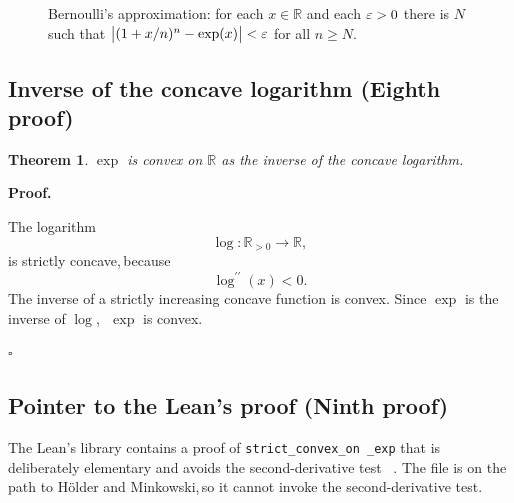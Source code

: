 \documentclass[11pt,reqno]{amsart}
\providecommand{\R}{\mathbb{R}}
\theoremstyle{redplain}
\newtheorem{theorem}{Theorem}[section]
\renewcommand{\qedsymbol}{\textcolor{proofqed}{\ensuremath{\square}}}
\renewenvironment{proof}[1][Proof]{\par\noindent\textbf{\textcolor{proofhead}{#1.}}\par\nobreak}{\par\nobreak\hfill\qedsymbol}
\providecommand{\comma}{,\,}
\numberwithin{equation}{section}
\begin{document}
\begin{figure}[tbph]
\centering
{}
\caption{Bernoulli's approximation: for each $x\in \R$ and each $\protect%
\varepsilon >0$ there is $N$ such that $\bigl|(1+x/n)^{n}-\exp (x)\bigr|<%
\protect\varepsilon $ for all $n\geq N$.}
\label{fig:bernoulli}
\end{figure}

\subsection{Inverse of the concave logarithm (Eighth proof)}

\begin{theorem}
\label{thm:log-inverse} $\exp $ is convex on $\R$ as the inverse of the
concave logarithm.
\end{theorem}

\begin{proof}
\noindent The logarithm 
\begin{equation*}
\log :\R_{>0}\rightarrow \R,
\end{equation*}
\noindent is strictly concave\comma because 
\begin{equation*}
\log ^{\prime \prime }(x)<0.
\end{equation*}
\noindent The inverse of a strictly increasing concave function is convex.
\noindent Since $\exp $ is the inverse of $\log $\comma\ $\exp $ is convex.
\end{proof}

\subsection{Pointer to the Lean's proof (Ninth proof)}

\noindent The Lean's library contains a proof of \texttt{strict\_convex\_on%
\_exp} that is deliberately elementary and avoids the second-derivative test~%
\cite{LeanMathlib}.\newline
The file is on the path to H\"{o}lder and Minkowski\comma so it cannot
invoke the second-derivative test.
\end{document}
